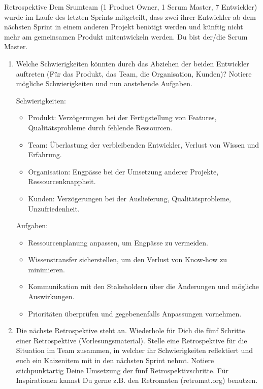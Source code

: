 \documentclass{article}
\author{Leopold Lemmermann}
\begin{document}
\createtitle


\begin{exercise}{Retrospektive}
  Dem Srumteam (1 Product Owner, 1 Scrum Master, 7 Entwickler) wurde im Laufe des letzten Sprints mitgeteilt, dass zwei ihrer Entwickler ab dem nächsten Sprint in einem anderen Projekt benötigt werden und künftig nicht mehr am gemeinsamen Produkt mitentwickeln werden. Du bist der/die Scrum Master.

  \begin{enumerate}
    \item Welche Schwierigkeiten könnten durch das Abziehen der beiden Entwickler auftreten (Für das Produkt, das Team, die Organisation, Kunden)? Notiere mögliche Schwierigkeiten und nun anstehende Aufgaben.
          \begin{solution}
            Schwierigkeiten:
            \begin{itemize}
              \item Produkt: Verzögerungen bei der Fertigstellung von Features, Qualitätsprobleme durch fehlende Ressourcen.
              \item Team: Überlastung der verbleibenden Entwickler, Verlust von Wissen und Erfahrung.
              \item Organisation: Engpässe bei der Umsetzung anderer Projekte, Ressourcenknappheit.
              \item Kunden: Verzögerungen bei der Auslieferung, Qualitätsprobleme, Unzufriedenheit.
            \end{itemize}
            Aufgaben:
            \begin{itemize}
              \item Ressourcenplanung anpassen, um Engpässe zu vermeiden.
              \item Wissenstransfer sicherstellen, um den Verlust von Know-how zu minimieren.
              \item Kommunikation mit den Stakeholdern über die Änderungen und mögliche Auswirkungen.
              \item Prioritäten überprüfen und gegebenenfalls Anpassungen vornehmen.
            \end{itemize}
          \end{solution}
    \item Die nächste Retrospektive steht an. Wiederhole für Dich die fünf Schritte einer Retrospektive (Vorlesungsmaterial). Stelle eine Retrospektive für die Situation im Team zusammen, in welcher ihr Schwierigkeiten reflektiert und euch ein Kaizenitem mit in den nächsten Sprint nehmt. Notiere stichpunktartig Deine Umsetzung der fünf Retrospektivschritte. Für Inspirationen kannst Du gerne z.B. den Retromaten (retromat.org) benutzen.

\end{enumerate}
\end{exercise}
\end{document}
